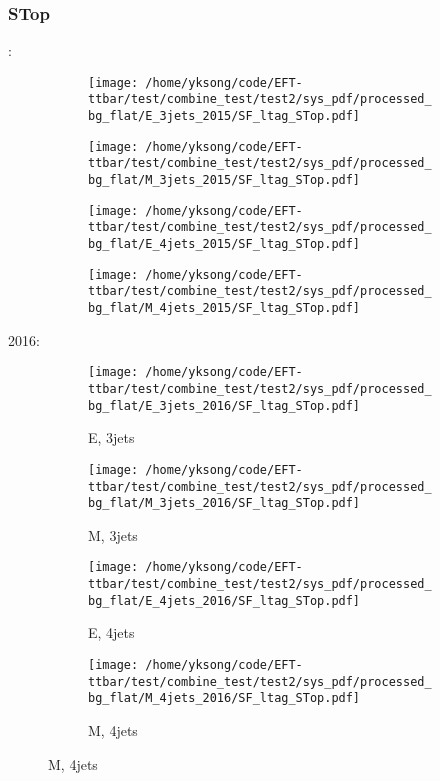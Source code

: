 \documentclass{beamer}
\begin{document}
\begin{frame}
\frametitle{STop}
\fontsize{5}{1}:
\begin{figure}
\centering
\begin{subfigure}[b]{0.24\textwidth}
\texttt{[image: /home/yksong/code/EFT-ttbar/test/combine\_test/test2/sys\_pdf/processed\_bg\_flat/E\_3jets\_2015/SF\_ltag\_STop.pdf]}
\end{subfigure}
\begin{subfigure}[b]{0.24\textwidth}
\texttt{[image: /home/yksong/code/EFT-ttbar/test/combine\_test/test2/sys\_pdf/processed\_bg\_flat/M\_3jets\_2015/SF\_ltag\_STop.pdf]}
\end{subfigure}
\begin{subfigure}[b]{0.24\textwidth}
\texttt{[image: /home/yksong/code/EFT-ttbar/test/combine\_test/test2/sys\_pdf/processed\_bg\_flat/E\_4jets\_2015/SF\_ltag\_STop.pdf]}
\end{subfigure}
\begin{subfigure}[b]{0.24\textwidth}
\texttt{[image: /home/yksong/code/EFT-ttbar/test/combine\_test/test2/sys\_pdf/processed\_bg\_flat/M\_4jets\_2015/SF\_ltag\_STop.pdf]}
\end{subfigure}
\end{figure}
2016:
\begin{figure}
\centering
\begin{subfigure}[b]{0.24\textwidth}
\texttt{[image: /home/yksong/code/EFT-ttbar/test/combine\_test/test2/sys\_pdf/processed\_bg\_flat/E\_3jets\_2016/SF\_ltag\_STop.pdf]}
\captionsetup{font=tiny}
\caption{E, 3jets}
\end{subfigure}
\begin{subfigure}[b]{0.24\textwidth}
\texttt{[image: /home/yksong/code/EFT-ttbar/test/combine\_test/test2/sys\_pdf/processed\_bg\_flat/M\_3jets\_2016/SF\_ltag\_STop.pdf]}
\captionsetup{font=tiny}
\caption{M, 3jets}
\end{subfigure}
\begin{subfigure}[b]{0.24\textwidth}
\texttt{[image: /home/yksong/code/EFT-ttbar/test/combine\_test/test2/sys\_pdf/processed\_bg\_flat/E\_4jets\_2016/SF\_ltag\_STop.pdf]}
\captionsetup{font=tiny}
\caption{E, 4jets}
\end{subfigure}
\begin{subfigure}[b]{0.24\textwidth}
\texttt{[image: /home/yksong/code/EFT-ttbar/test/combine\_test/test2/sys\_pdf/processed\_bg\_flat/M\_4jets\_2016/SF\_ltag\_STop.pdf]}
\captionsetup{font=tiny}
\caption{M, 4jets}
\end{subfigure}
\end{figure}
\end{frame}
\end{document}
